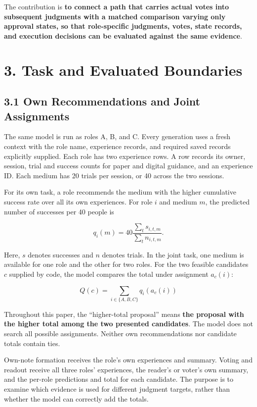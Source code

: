 \documentclass[10pt,a4paper]{article}
\begin{document}
The contribution is \textbf{to connect a path that carries actual votes into subsequent judgments with a matched comparison varying only approval states, so that role-specific judgments, votes, state records, and execution decisions can be evaluated against the same evidence}.

\section{3. Task and Evaluated Boundaries}\label{paper-04-task-and-evaluated-boundaries}

\subsection{3.1 Own Recommendations and Joint Assignments}\label{paper-04-own-recommendations-and-joint-assignments}

The same model is run as roles A, B, and C. Every generation uses a fresh context with the role name, experience records, and required saved records explicitly supplied. Each role has two experience rows. A row records its owner, session, trial and success counts for paper and digital guidance, and an experience ID. Each medium has 20 trials per session, or 40 across the two sessions.

For its own task, a role recommends the medium with the higher cumulative success rate over all its own experiences. For role \(i\) and medium \(m\), the predicted number of successes per 40 people is

\[
q_i(m)=40\frac{\sum_t s_{i,t,m}}{\sum_t n_{i,t,m}}.
\]

Here, \(s\) denotes successes and \(n\) denotes trials. In the joint task, one medium is available for one role and the other for two roles. For the two feasible candidates \(c\) supplied by code, the model compares the total under assignment \(a_c(i)\):

\[
Q(c)=\sum_{i\in\{A,B,C\}}q_i(a_c(i))
\]

Throughout this paper, the ``higher-total proposal'' means \textbf{the proposal with the higher total among the two presented candidates}. The model does not search all possible assignments. Neither own recommendations nor candidate totals contain ties.

Own-note formation receives the role's own experiences and summary. Voting and readout receive all three roles' experiences, the reader's or voter's own summary, and the per-role predictions and total for each candidate. The purpose is to examine which evidence is used for different judgment targets, rather than whether the model can correctly add the totals.
\end{document}
